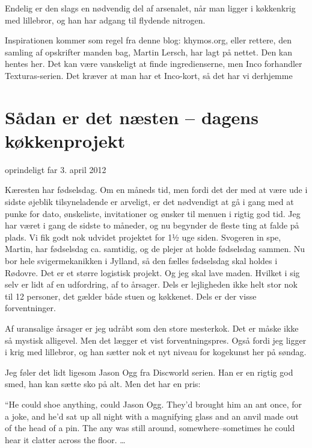 \documentclass[
  letterpaper,
  DIV=11,
  numbers=noendperiod]{scrreprt}
\begin{document}
Endelig er den slags en nødvendig del af arsenalet, når man ligger i
køkkenkrig med lillebror, og han har adgang til flydende nitrogen.

Inspirationen kommer som regel fra denne blog: khymos.org, eller
rettere, den samling af opskrifter manden bag, Martin Lersch, har lagt
på nettet. Den kan hentes her. Det kan være vanskeligt at finde
ingredienserne, men Inco forhandler Texturas-serien. Det kræver at man
har et Inco-kort, så det har vi derhjemme

\hypertarget{suxe5dan-er-det-nuxe6sten-dagens-kuxf8kkenprojekt}{%
\section{Sådan er det næsten -- dagens
køkkenprojekt}\label{suxe5dan-er-det-nuxe6sten-dagens-kuxf8kkenprojekt}}

oprindeligt far 3. april 2012

Kæresten har fødselsdag. Om en måneds tid, men fordi det der med at være
ude i sidste øjeblik tilsyneladende er arveligt, er det nødvendigt at gå
i gang med at punke for dato, ønskeliste, invitationer og ønsker til
menuen i rigtig god tid. Jeg har været i gang de sidste to måneder, og
nu begynder de fleste ting at falde på plads. Vi fik godt nok udvidet
projektet for 1½ uge siden. Svogeren in spe, Martin, har fødselsdag ca.
samtidig, og de plejer at holde fødselsdag sammen. Nu bor hele
svigermekanikken i Jylland, så den fælles fødselsdag skal holdes i
Rødovre. Det er et større logistisk projekt. Og jeg skal lave maden.
Hvilket i sig selv er lidt af en udfordring, af to årsager. Dels er
lejligheden ikke helt stor nok til 12 personer, det gælder både stuen og
køkkenet. Dels er der visse forventninger.

Af uransalige årsager er jeg udråbt som den store mesterkok. Det er
måske ikke så mystisk alligevel. Men det lægger et vist
forventningspres. Også fordi jeg ligger i krig med lillebror, og han
sætter nok et nyt niveau for kogekunst her på søndag.

Jeg føler det lidt ligesom Jason Ogg fra Discworld serien. Han er en
rigtig god smed, han kan sætte sko på alt. Men det har en pris:

``He could shoe anything, could Jason Ogg. They'd brought him an ant
once, for a joke, and he'd sat up all night with a magnifying glass and
an anvil made out of the head of a pin. The any was still around,
somewhere--sometimes he could hear it clatter across the floor. \ldots{}
\end{document}
